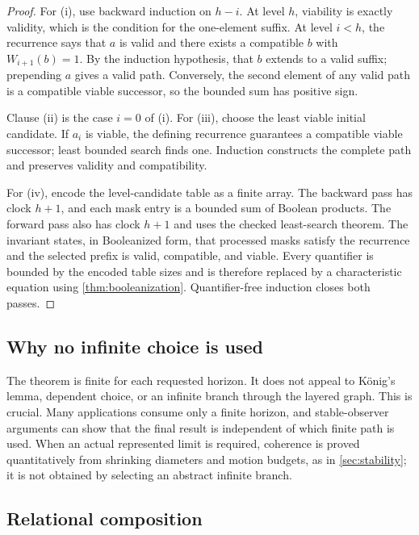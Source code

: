 \begin{proof}
For (i), use backward induction on \(h-i\).  At level \(h\), viability is exactly
validity, which is the condition for the one-element suffix.  At level \(i<h\), the
recurrence says that \(a\) is valid and there exists a compatible \(b\) with
\(W_{i+1}(b)=1\).  By the induction hypothesis, that \(b\) extends to a valid suffix;
prepending \(a\) gives a valid path.  Conversely, the second element of any valid path
is a compatible viable successor, so the bounded sum has positive sign.

Clause (ii) is the case \(i=0\) of (i).  For (iii), choose the least viable initial
candidate.  If \(a_i\) is viable, the defining recurrence guarantees a compatible
viable successor; least bounded search finds one.  Induction constructs the complete
path and preserves validity and compatibility.

For (iv), encode the level-candidate table as a finite array.  The backward pass has
clock \(h+1\), and each mask entry is a bounded sum of Boolean products.  The forward
pass also has clock \(h+1\) and uses the checked least-search theorem.  The invariant
states, in Booleanized form, that processed masks satisfy the recurrence and the
selected prefix is valid, compatible, and viable.  Every quantifier is bounded by the
encoded table sizes and is therefore replaced by a characteristic equation using
\cref{thm:booleanization}.  Quantifier-free induction closes both passes.
\end{proof}

\subsection{Why no infinite choice is used}

The theorem is finite for each requested horizon.  It does not appeal to K\"onig's
lemma, dependent choice, or an infinite branch through the layered graph.  This is
crucial.  Many applications consume only a finite horizon, and stable-observer
arguments can show that the final result is independent of which finite path is used.
When an actual represented limit is required, coherence is proved quantitatively from
shrinking diameters and motion budgets, as in \cref{sec:stability}; it is not obtained
by selecting an abstract infinite branch.

\subsection{Relational composition}

